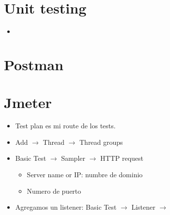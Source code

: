 \section{Unit testing}
\begin{itemize}
    \item 
\end{itemize}


\section{Postman}

\section{Jmeter}
\begin{itemize}[label=$\downarrow$]
    \item Test plan es mi route de los tests.
    \item Add $\rightarrow$ Thread $\rightarrow$ Thread groups
    \item Basic Test $\rightarrow$ Sampler $\rightarrow$ HTTP request
        \begin{itemize}[label=$\downarrow$]
            \item Server name or IP: numbre de dominio 
            \item Numero de puerto 
        \end{itemize}
    \item Agregamos un listener:
        Basic Test $\rightarrow$ Listener $\rightarrow$ 
        
\end{itemize}
